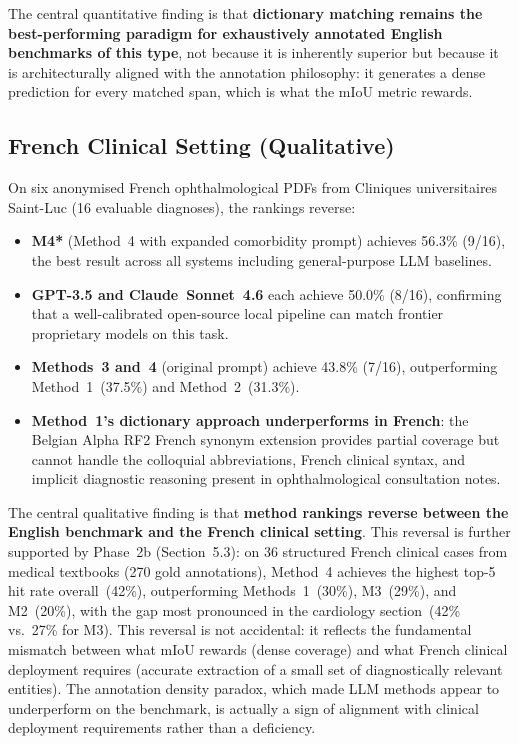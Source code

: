 The central quantitative finding is that \textbf{dictionary matching remains the best-performing paradigm for exhaustively annotated English benchmarks of this type}, not because it is inherently superior but because it is architecturally aligned with the annotation philosophy: it generates a dense prediction for every matched span, which is what the mIoU metric rewards.

\subsection{French Clinical Setting (Qualitative)}

On six anonymised French ophthalmological PDFs from Cliniques universitaires Saint-Luc (16 evaluable diagnoses), the rankings reverse:

\begin{itemize}
    \item \textbf{M4*} (Method~4 with expanded comorbidity prompt) achieves 56.3\% (9/16), the best result across all systems including general-purpose LLM baselines.
    \item \textbf{GPT-3.5 and Claude~Sonnet~4.6} each achieve 50.0\% (8/16), confirming that a well-calibrated open-source local pipeline can match frontier proprietary models on this task.
    \item \textbf{Methods~3 and~4} (original prompt) achieve 43.8\% (7/16), outperforming Method~1~(37.5\%) and Method~2~(31.3\%).
    \item \textbf{Method~1's dictionary approach underperforms in French}: the Belgian Alpha RF2 French synonym extension provides partial coverage but cannot handle the colloquial abbreviations, French clinical syntax, and implicit diagnostic reasoning present in ophthalmological consultation notes.
\end{itemize}

The central qualitative finding is that \textbf{method rankings reverse between the English benchmark and the French clinical setting}. This reversal is further supported by Phase~2b (Section~5.3): on 36 structured French clinical cases from medical textbooks (270 gold annotations), Method~4 achieves the highest top-5 hit rate overall~(42\%), outperforming Methods~1~(30\%), M3~(29\%), and M2~(20\%), with the gap most pronounced in the cardiology section~(42\% vs.\ 27\% for M3). This reversal is not accidental: it reflects the fundamental mismatch between what mIoU rewards (dense coverage) and what French clinical deployment requires (accurate extraction of a small set of diagnostically relevant entities). The annotation density paradox, which made LLM methods appear to underperform on the benchmark, is actually a sign of alignment with clinical deployment requirements rather than a deficiency.

